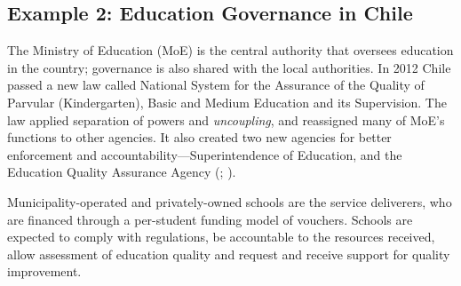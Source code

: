\documentclass[a4paper, 12pt, twoside]{article}
\begin{document}
\subsection*{Example 2: Education Governance in Chile}

The Ministry of Education (MoE) is the central authority that oversees education in the country; governance is also shared with the local authorities. In 2012 Chile passed a new law called National System for the Assurance of the Quality of Parvular (Kindergarten), Basic and Medium Education and its Supervision. The law applied separation of powers and \textit{uncoupling}, and reassigned many of MoE’s functions to other agencies. It also created two new agencies for better enforcement and accountability—Superintendence of Education, and the Education Quality Assurance Agency (\cite{nhlpc_chile}; \cite{chile_ed_policy}).

Municipality-operated and privately-owned schools are the service deliverers, who are financed through a per-student funding model of vouchers. Schools are expected to comply with regulations, be accountable to the resources received, allow assessment of education quality and request and receive support for quality improvement.
\end{document}
